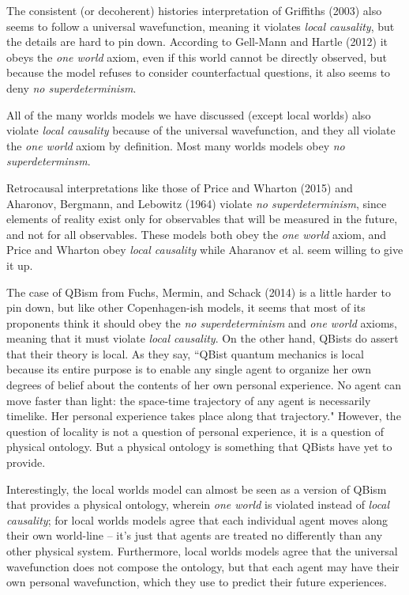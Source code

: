 \documentclass[12pt]{article}
\begin{document}
The consistent (or decoherent) histories interpretation of Griffiths (2003) also seems to follow a universal wavefunction, meaning it violates \textit{local causality}, but the details are hard to pin down.  According to Gell-Mann and Hartle (2012) it obeys the \textit{one world} axiom, even if this world cannot be directly observed, but because the model refuses to consider counterfactual questions, it also seems to deny \textit{no superdeterminism}.

All of the many worlds models we have discussed (except local worlds) also violate \textit{local causality} because of the universal wavefunction, and they all violate the \textit{one world} axiom by definition.  Most many worlds models obey \textit{no superdeterminsm}. 
 
Retrocausal interpretations like those of Price and Wharton (2015) and Aharonov,  Bergmann, and Lebowitz (1964) violate \textit{no superdeterminism}, since elements of reality exist only for observables that will be measured in the future, and not for all observables.  These models both obey the \textit{one world} axiom, and Price and Wharton obey \textit{local causality} while Aharanov et al. seem willing to give it up.
 
 The case of QBism from Fuchs, Mermin, and Schack (2014) is a little harder to pin down, but like other Copenhagen-ish models, it seems that most of its proponents think it should obey the \textit{no superdeterminism} and \textit{one world} axioms, meaning that it must violate \textit{local causality}. On the other hand, QBists do assert that their theory is local. As they say, ``QBist quantum mechanics is local because its entire purpose is to enable any single agent to organize her own degrees of belief about the contents of her own personal experience. No agent can move faster than light: the space-time trajectory of any agent is necessarily timelike. Her personal experience takes place along that trajectory." However,  the question of locality is not a question of personal experience, it is a question of physical ontology. But a physical ontology is something that QBists have yet to provide.  
 
Interestingly, the local worlds model can almost be seen as a version of QBism that provides a physical ontology, wherein \textit{one world} is violated instead of \textit{local causality}; for local worlds models agree that each individual agent moves along their own world-line -- it's just that agents are treated no differently than any other physical system. Furthermore, local worlds models agree that the universal wavefunction does not compose the ontology, but that each agent may have their own personal wavefunction, which they use to predict their future experiences. 
\end{document}
